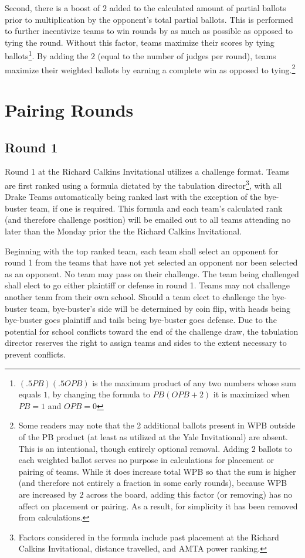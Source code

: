 \documentclass{article}
\begin{document}
Second, there is a boost of $2$ added to the calculated amount of partial ballots prior to multiplication by the opponent's total partial ballots.  This is performed to further incentivize teams to win rounds by as much as possible as opposed to tying the round.  Without this factor, teams maximize their scores by tying ballots\footnote{$\left(.5PB\right)\left(.5OPB\right)$ is the maximum product of any two numbers whose sum equals $1$, by changing the formula to $PB\left(OPB+2\right)$ it is maximized when $PB=1$ and $OPB=0$}.  By adding the $2$ (equal to the number of judges per round), teams maximize their weighted ballots by earning a complete win as opposed to tying.\footnote{Some readers may note that the 2 additional ballots present in WPB outside of the PB product (at least as utilized at the Yale Invitational) are absent.  This is an intentional, though entirely optional removal.  Adding $2$ ballots to each weighted ballot serves no purpose in calculations for placement or pairing of teams.  While it does increase total WPB so that the sum is higher (and therefore not entirely a fraction in some early rounds), because WPB are increased by $2$ across the board, adding this factor (or removing) has no affect on placement or pairing.  As a result, for simplicity it has been removed from calculations.}
\section{Pairing Rounds}
\label{roundPairing}
\subsection{Round 1}
Round 1 at the Richard Calkins Invitational utilizes a challenge format.  Teams are first ranked using a formula dictated by the tabulation director\footnote{Factors considered in the formula include past placement at the Richard Calkins Invitational, distance travelled, and AMTA power ranking.}, with all Drake Teams automatically being ranked last with the exception of the bye-buster team, if one is required.  This formula and each team's calculated rank (and therefore challenge position) will be emailed out to all teams attending no later than the Monday prior the the Richard Calkins Invitational.

Beginning with the top ranked team, each team shall select an opponent for round 1 from the teams that have not yet selected an opponent nor been selected as an opponent.  No team may pass on their challenge.  The team being challenged shall elect to go either plaintiff or defense in round 1.  Teams may not challenge another team from their own school.  Should a team elect to challenge the bye-buster team, bye-buster's side will be determined by coin flip, with heads being bye-buster goes plaintiff and tails being bye-buster goes defense.  Due to the potential for school conflicts toward the end of the challenge draw, the tabulation director reserves the right to assign teams and sides to the extent necessary to prevent conflicts.
\end{document}
